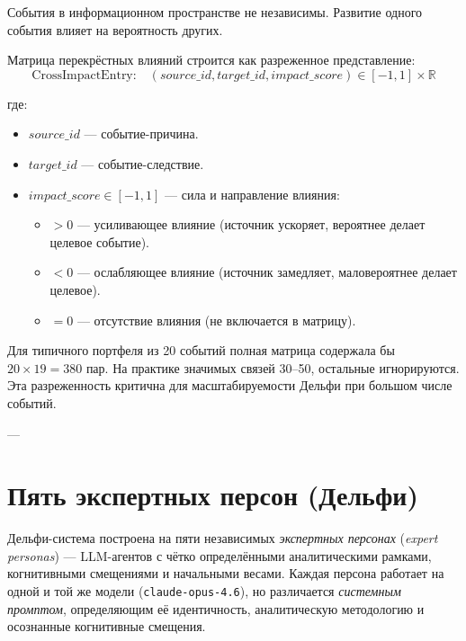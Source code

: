 
События в информационном пространстве не независимы. Развитие одного события влияет на вероятность других.

Матрица перекрёстных влияний строится как разреженное представление:
\begin{equation}
    \text{CrossImpactEntry:} \quad (source\_id, target\_id, impact\_score) \in [-1, 1] \times \mathbb{R}
\end{equation}

где:
\begin{itemize}
    \item $source\_id$ — событие-причина.
    \item $target\_id$ — событие-следствие.
    \item $impact\_score \in [-1, 1]$ — сила и направление влияния:
    \begin{itemize}
        \item $> 0$ — усиливающее влияние (источник ускоряет, вероятнее делает целевое событие).
        \item $< 0$ — ослабляющее влияние (источник замедляет, маловероятнее делает целевое).
        \item $= 0$ — отсутствие влияния (не включается в матрицу).
    \end{itemize}
\end{itemize}

Для типичного портфеля из 20 событий полная матрица содержала бы $20 \times 19 = 380$ пар. На практике значимых связей 30–50, остальные игнорируются. Эта разреженность критична для масштабируемости Дельфи при большом числе событий.

---


\section{Пять экспертных персон (Дельфи)}


Дельфи-система построена на пяти независимых \emph{экспертных персонах} (\emph{expert personas}) — LLM-агентов с чётко определёнными аналитическими рамками, когнитивными смещениями и начальными весами. Каждая персона работает на одной и той же модели (\texttt{claude-opus-4.6}), но различается \emph{системным промптом}, определяющим её идентичность, аналитическую методологию и осознанные когнитивные смещения.

